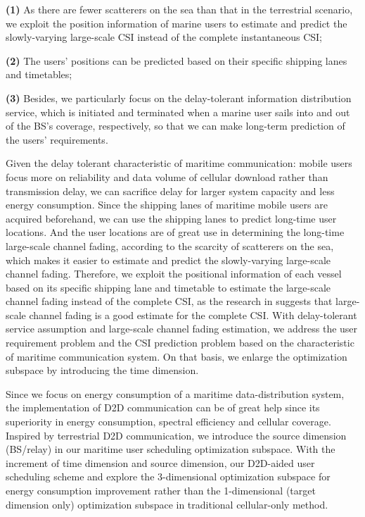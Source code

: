 \documentclass{ieeeaccess}
\begin{document}
\textbf{(1)} As there are fewer scatterers on the sea than that in the terrestrial scenario, we exploit the position information of marine users to estimate and predict the slowly-varying large-scale CSI instead of the complete instantaneous CSI;

\textbf{(2)} The users' positions can be predicted based on their specific shipping lanes and timetables;

\textbf{(3)} Besides, we particularly focus on the delay-tolerant information distribution service, which is initiated and terminated when a marine user sails into and out of the BS's coverage, respectively, so that we can make long-term prediction of the users' requirements.


Given the delay tolerant characteristic of maritime communication: mobile users focus more on reliability and data volume of cellular download rather than transmission delay, we can sacrifice delay for larger system capacity and less energy consumption. 
Since the shipping lanes of maritime mobile users are acquired beforehand, we can use the shipping lanes to predict long-time user locations. And the user locations are of great use in determining the long-time large-scale channel fading, according to the scarcity of scatterers on the sea, which makes it easier to estimate and predict the slowly-varying large-scale channel fading. Therefore, we exploit the positional information of each vessel based on its specific shipping lane and timetable to estimate the large-scale channel fading instead of the complete CSI, as the research in \cite{p120} suggests that large-scale channel fading is a good estimate for the complete CSI. %
With delay-tolerant service assumption and large-scale channel fading estimation, we address the user requirement problem and the CSI prediction problem based on the characteristic of maritime communication system. On that basis, we enlarge the optimization subspace by introducing the time dimension. 

Since we focus on energy consumption of a maritime data-distribution system, the implementation of D2D communication can be of great help since its superiority in energy consumption, spectral efficiency and cellular coverage. Inspired by terrestrial D2D communication, we introduce the source dimension (BS/relay) in our maritime user scheduling optimization subspace. With the increment of time dimension and source dimension, our D2D-aided user scheduling scheme and explore the 3-dimensional optimization subspace for energy consumption improvement rather than the 1-dimensional (target dimension only) optimization subspace in traditional cellular-only method. 
\end{document}
